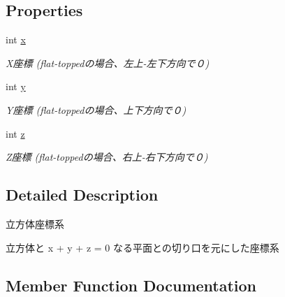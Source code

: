 \subsection*{Properties}
\begin{DoxyCompactItemize}
\item 
int \mbox{\hyperlink{struct_hexagonal_map_1_1_domain_1_1_hex_map_1_1_cube_coordinate_a4a7206575c3354e7eba699cef5811329}{x}}
\begin{DoxyCompactList}\small\item\em X座標 (flat-\/toppedの場合、左上-\/左下方向で０) \end{DoxyCompactList}\item 
int \mbox{\hyperlink{struct_hexagonal_map_1_1_domain_1_1_hex_map_1_1_cube_coordinate_a7a85b59a781b6bc6a1e028db63fb94b0}{y}}
\begin{DoxyCompactList}\small\item\em Y座標 (flat-\/toppedの場合、上下方向で０) \end{DoxyCompactList}\item 
int \mbox{\hyperlink{struct_hexagonal_map_1_1_domain_1_1_hex_map_1_1_cube_coordinate_a34cecd0b18328917cf707fb108cf18bb}{z}}
\begin{DoxyCompactList}\small\item\em Z座標 (flat-\/toppedの場合、右上-\/右下方向で０) \end{DoxyCompactList}\end{DoxyCompactItemize}


\subsection{Detailed Description}
立方体座標系 

立方体と x + y + z = 0 なる平面との切り口を元にした座標系

\subsection{Member Function Documentation}
\mbox{\label{struct_hexagonal_map_1_1_domain_1_1_hex_map_1_1_cube_coordinate_a551d26721b23522e409dbab04d35b2d6}} 
